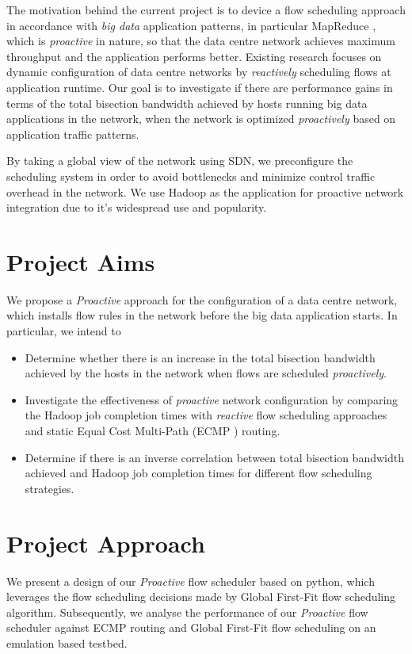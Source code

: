 The motivation behind the current project is to device a flow scheduling approach in accordance with \textit{big data} application patterns, in particular MapReduce \cite{dean2008mapreduce}, which is \textit{proactive} in nature, so that the data centre network achieves maximum throughput and the application performs better. Existing research focuses on dynamic configuration of data centre networks by \textit{reactively} scheduling flows at application runtime. Our goal is to investigate if there are performance gains in terms of the total bisection bandwidth achieved by hosts running big data applications in the network, when the network is optimized \textit{proactively} based on application traffic patterns. 

By taking a global view of the network using SDN, we preconfigure the scheduling system in order to avoid bottlenecks and minimize control traffic overhead in the network. We use Hadoop \cite{HadoopWeb} as the application for proactive network integration due to it's widespread use and popularity. 

\section{Project Aims}
We propose a \textit{Proactive} approach for the configuration of a data centre network, which installs flow rules in the network before the big data application starts. In particular, we intend to 
\begin{itemize}
\item Determine whether there is an increase in the total bisection bandwidth achieved by the hosts in the network when flows are scheduled \textit{proactively}.  
\item Investigate the effectiveness of \textit{proactive} network configuration by comparing the Hadoop job completion times with \textit{reactive} flow scheduling approaches and static Equal Cost Multi-Path (ECMP \cite{hopps2000analysis}) routing.
\item Determine if there is an inverse correlation between total bisection bandwidth achieved and Hadoop job completion times for different flow scheduling strategies.  
\end{itemize}
\section{Project Approach}
We present a design of our \textit{Proactive} flow scheduler based on python, which leverages the flow scheduling decisions made by Global First-Fit \cite{al2010hedera} flow scheduling algorithm. Subsequently, we analyse the performance of our \textit{Proactive} flow scheduler against ECMP routing and Global First-Fit flow scheduling on an emulation based testbed.
